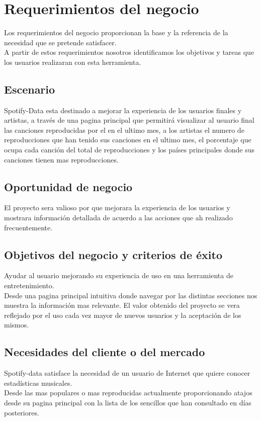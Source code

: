 \documentclass[12pt,a4paper]{book}
\begin{document}
\chapter{Requerimientos del negocio}
Los requerimientos del negocio proporcionan la base y la referencia de la necesidad que se pretende satisfacer.\\
A partir de estos requerimientos nosotros identificamos los objetivos y tareas que los usuarios realizaran con esta herramienta.
\section{Escenario}
\vspace{0.5 cm}
Spotify-Data esta destinado a mejorar la experiencia de los usuarios finales y artistas, a través de una pagina principal que permitirá visualizar al usuario final las canciones reproducidas por el en el ultimo mes, a los artistas el numero de reproducciones que han tenido sus canciones en el ultimo mes, el porcentaje que ocupa cada canción del total de reproducciones y los países principales donde sus canciones tienen mas reproducciones.
\section{Oportunidad de negocio}
\vspace{0.5 cm}
El proyecto sera valioso por que mejorara la experiencia de los usuarios y mostrara información detallada de acuerdo a las acciones que ah realizado frecuentemente.
\section{Objetivos del negocio y criterios de éxito}
\vspace{0.5 cm}
Ayudar al usuario mejorando su experiencia de uso en una herramienta de entretenimiento.\\ 
Desde una pagina principal intuitiva donde navegar por las distintas secciones nos muestra la información mas relevante. 
El valor obtenido del proyecto se vera reflejado por el uso cada vez mayor de nuevos usuarios y la aceptación de los mismos.
\newpage
\vspace{0.5 cm}
\section{Necesidades del cliente o del mercado}
\vspace{0.5 cm}
Spotify-data satisface la necesidad de un usuario de Internet que quiere conocer estadísticas musicales.\\
Desde las mas populares o mas reproducidas actualmente proporcionando atajos desde su pagina principal con la lista de los sencillos que han consultado en días posteriores.\\
\end{document}
